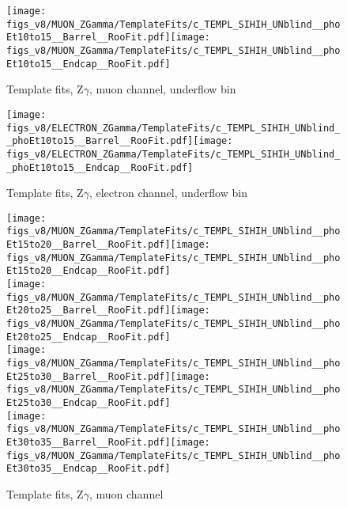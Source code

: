 \begin{figure}[htb]
  \begin{center}
   \texttt{[image: figs\_v8/MUON\_ZGamma/TemplateFits/c\_TEMPL\_SIHIH\_UNblind\_\_phoEt10to15\_\_Barrel\_\_RooFit.pdf]}\texttt{[image: figs\_v8/MUON\_ZGamma/TemplateFits/c\_TEMPL\_SIHIH\_UNblind\_\_phoEt10to15\_\_Endcap\_\_RooFit.pdf]}\\
  \label{fig:templateFits_SIHIH_MUON_ZGamma_0}
  \caption{Template fits, Z$\gamma$, muon channel, underflow bin}
  \end{center}
\end{figure}

\begin{figure}[htb]
  \begin{center}
   \texttt{[image: figs\_v8/ELECTRON\_ZGamma/TemplateFits/c\_TEMPL\_SIHIH\_UNblind\_\_phoEt10to15\_\_Barrel\_\_RooFit.pdf]}\texttt{[image: figs\_v8/ELECTRON\_ZGamma/TemplateFits/c\_TEMPL\_SIHIH\_UNblind\_\_phoEt10to15\_\_Endcap\_\_RooFit.pdf]}\\
  \label{fig:templateFits_SIHIH_ELECTRON_ZGamma_0}
  \caption{Template fits, Z$\gamma$, electron channel, underflow bin}
  \end{center}
\end{figure}

\begin{figure}[htb]
  \begin{center}
   \texttt{[image: figs\_v8/MUON\_ZGamma/TemplateFits/c\_TEMPL\_SIHIH\_UNblind\_\_phoEt15to20\_\_Barrel\_\_RooFit.pdf]}\texttt{[image: figs\_v8/MUON\_ZGamma/TemplateFits/c\_TEMPL\_SIHIH\_UNblind\_\_phoEt15to20\_\_Endcap\_\_RooFit.pdf]}\\
   \texttt{[image: figs\_v8/MUON\_ZGamma/TemplateFits/c\_TEMPL\_SIHIH\_UNblind\_\_phoEt20to25\_\_Barrel\_\_RooFit.pdf]}\texttt{[image: figs\_v8/MUON\_ZGamma/TemplateFits/c\_TEMPL\_SIHIH\_UNblind\_\_phoEt20to25\_\_Endcap\_\_RooFit.pdf]}\\
   \texttt{[image: figs\_v8/MUON\_ZGamma/TemplateFits/c\_TEMPL\_SIHIH\_UNblind\_\_phoEt25to30\_\_Barrel\_\_RooFit.pdf]}\texttt{[image: figs\_v8/MUON\_ZGamma/TemplateFits/c\_TEMPL\_SIHIH\_UNblind\_\_phoEt25to30\_\_Endcap\_\_RooFit.pdf]}\\
   \texttt{[image: figs\_v8/MUON\_ZGamma/TemplateFits/c\_TEMPL\_SIHIH\_UNblind\_\_phoEt30to35\_\_Barrel\_\_RooFit.pdf]}\texttt{[image: figs\_v8/MUON\_ZGamma/TemplateFits/c\_TEMPL\_SIHIH\_UNblind\_\_phoEt30to35\_\_Endcap\_\_RooFit.pdf]}\\
  \label{fig:templateFits_SIHIH_MUON_ZGamma_1}
  \caption{Template fits, Z$\gamma$, muon channel}
  \end{center}
\end{figure}

